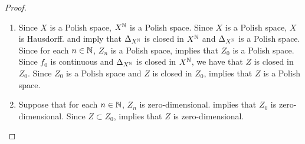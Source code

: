\documentclass{book}
\begin{document}
\begin{proof}
\begin{enumerate}
			\begin{align*}
				f \circ g (x)
				& = f_1 \circ \pi_1(g(x)) \\
				& = f_m \circ \pi_m(g(x)) \\
				& = f_m (f_m^{-1}(x)) \\
				& = x,
			\end{align*} 
			so that $f \circ g = \id_B$. We note that for each $z \in Z$ and $m \in \N$,
			\begin{align*}
				\pi_m \circ g \circ f(z) \\
				& = \pi_m \circ g \circ (f_1 \circ \pi_1)(z) \\
				& = \pi_m \circ g \circ (f_m \circ \pi_m)(z) \\
				& = g(f_m ( \pi_m(z)))_m \\
				& = f_m^{-1}(f_m ( \pi_m(z))) \\
				& = \pi_m(z),
			\end{align*} 
			so that $g \circ f = \id_Z$. Hence $f^{-1} = g$.
			\begin{itemize}
				\item Since $f$ is continuous, $f$ is measurable. 
				\item Since for each $n \in \N$, $f_n^{-1}$ is measurable, we have that for each $n \in \N$, $f_n^{-1}|_B$ is measurable.  then implies that $f^{-1}$ is measurable. Hence $f$ is a measurable isomorphism.  
			\end{itemize} 
			\item Since $X$ is a Polish space, $X^{\mathbb{N}}$ is a Polish space. Since $X$ is a Polish space, $X$ is Hausdorff.  and  imply that $\Delta_{X^{\mathbb{N}}}$ is closed in $X^{\mathbb{N}}$ and $\Delta_{X^{\mathbb{N}}}$ is a Polish space. Since for each $n \in \N$, $Z_n$ is a Polish space,  implies that $Z_0$ is a Polish space. Since $f_0$ is continuous and $\Delta_{X^{\mathbb{N}}}$ is closed in $X^{\mathbb{N}}$, we have that $Z$ is closed in $Z_0$. Since $Z_0$ is a Polish space and $Z$ is closed in $Z_0$,  implies that $Z$ is a Polish space. 
			\item Suppose that for each $n \in \N$, $Z_n$ is zero-dimensional.  implies that $Z_0$ is zero-dimensional. Since $Z \subset Z_0$,  implies that $Z$ is zero-dimensional.
		\end{enumerate}
	\end{proof}
\end{document}
